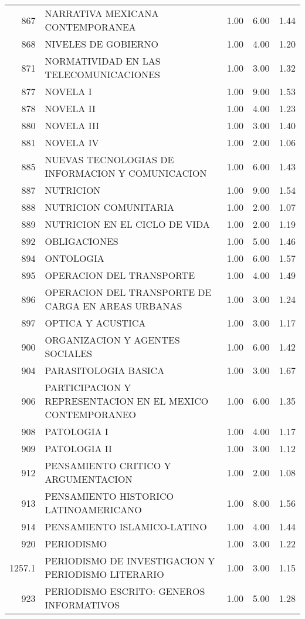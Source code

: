 \documentclass[12pt]{article}
\begin{document}
\begin{table}[ht]
\begin{tabular}{rlrrr}
  867 & NARRATIVA MEXICANA CONTEMPORANEA & 1.00 & 6.00 & 1.44 \\ 
  868 & NIVELES DE GOBIERNO & 1.00 & 4.00 & 1.20 \\ 
  871 & NORMATIVIDAD EN LAS TELECOMUNICACIONES & 1.00 & 3.00 & 1.32 \\ 
  877 & NOVELA I & 1.00 & 9.00 & 1.53 \\ 
  878 & NOVELA II & 1.00 & 4.00 & 1.23 \\ 
  880 & NOVELA III & 1.00 & 3.00 & 1.40 \\ 
  881 & NOVELA IV & 1.00 & 2.00 & 1.06 \\ 
  885 & NUEVAS TECNOLOGIAS DE INFORMACION Y COMUNICACION & 1.00 & 6.00 & 1.43 \\ 
  887 & NUTRICION & 1.00 & 9.00 & 1.54 \\ 
  888 & NUTRICION COMUNITARIA & 1.00 & 2.00 & 1.07 \\ 
  889 & NUTRICION EN EL CICLO DE VIDA & 1.00 & 2.00 & 1.19 \\ 
  892 & OBLIGACIONES & 1.00 & 5.00 & 1.46 \\ 
  894 & ONTOLOGIA & 1.00 & 6.00 & 1.57 \\ 
  895 & OPERACION DEL TRANSPORTE & 1.00 & 4.00 & 1.49 \\ 
  896 & OPERACION DEL TRANSPORTE DE CARGA EN AREAS URBANAS & 1.00 & 3.00 & 1.24 \\ 
  897 & OPTICA Y ACUSTICA & 1.00 & 3.00 & 1.17 \\ 
  900 & ORGANIZACION Y AGENTES SOCIALES & 1.00 & 6.00 & 1.42 \\ 
  904 & PARASITOLOGIA BASICA & 1.00 & 3.00 & 1.67 \\ 
  906 & PARTICIPACION Y REPRESENTACION EN EL MEXICO CONTEMPORANEO & 1.00 & 6.00 & 1.35 \\ 
  908 & PATOLOGIA I & 1.00 & 4.00 & 1.17 \\ 
  909 & PATOLOGIA II & 1.00 & 3.00 & 1.12 \\ 
  912 & PENSAMIENTO CRITICO Y ARGUMENTACION & 1.00 & 2.00 & 1.08 \\ 
  913 & PENSAMIENTO HISTORICO LATINOAMERICANO & 1.00 & 8.00 & 1.56 \\ 
  914 & PENSAMIENTO ISLAMICO-LATINO & 1.00 & 4.00 & 1.44 \\ 
  920 & PERIODISMO & 1.00 & 3.00 & 1.22 \\ 
  1257.1 & PERIODISMO DE INVESTIGACION Y PERIODISMO LITERARIO & 1.00 & 3.00 & 1.15 \\ 
  923 & PERIODISMO ESCRITO: GENEROS INFORMATIVOS & 1.00 & 5.00 & 1.28 \\ 

\end{tabular}
\end{table}
\end{document}
